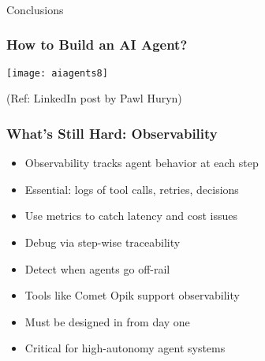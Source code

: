 \begin{frame}[fragile]\frametitle{}
\begin{center}
{\Large Conclusions}
\end{center}
\end{frame}

\begin{frame}[fragile]\frametitle{How to Build an AI Agent?}

	\begin{center}
	\texttt{[image: aiagents8]}
	
	{\tiny (Ref: LinkedIn post by Pawl Huryn)}
	
	\end{center}
	
\end{frame}


\begin{frame}[fragile]\frametitle{What’s Still Hard: Observability}

      \begin{itemize}
        \item Observability tracks agent behavior at each step
        \item Essential: logs of tool calls, retries, decisions
        \item Use metrics to catch latency and cost issues
        \item Debug via step-wise traceability
        \item Detect when agents go off-rail
        \item Tools like Comet Opik support observability
        \item Must be designed in from day one
        \item Critical for high-autonomy agent systems
      \end{itemize}

\end{frame}

